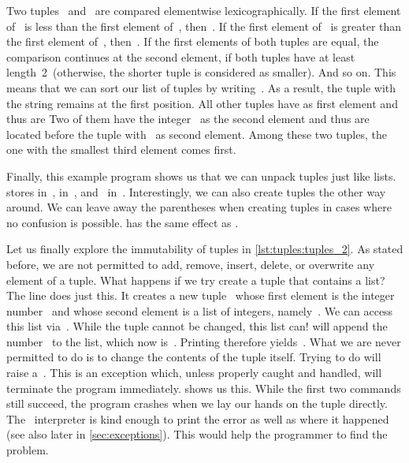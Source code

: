 Two tuples~ and~ are compared elementwise lexicographically.
If the first element of~ is less than the first element of~, then~.
If the first element of~ is greater than the first element of~, then~.
If the first elements of both tuples are equal, the comparison continues at the second element, if both tuples have at least length~2~(otherwise, the shorter tuple is considered as smaller).
And so on.
This means that we can sort our list of tuples by writing~.
As a result, the tuple with the string  remains at the first position.
All other tuples have  as first element and thus are 
Two of them have the integer~ as the second element and thus are located before the tuple with~ as second element.
Among these two tuples, the one with the smallest third element comes first.

Finally, this example program shows us that we can unpack tuples just like lists.
 stores  in~,  in~, and~ in~.
Interestingly, we can also create tuples the other way around.
We can leave away the parentheses when creating tuples in cases where no confusion is possible.
 has the same effect as .

Let us finally explore the immutability of tuples in \cref{lst:tuples:tuples_2}.
As stated before, we are not permitted to add, remove, insert, delete, or overwrite any element of a tuple.
What happens if we try create a tuple that contains a list?
The line  does just this.
It creates a new tuple~ whose first element is the integer number~ and whose second element is a list of integers, namely~\pythonil{[2]}.
We can access this list via~.
While the tuple cannot be changed, this list can!
 will append the number~ to the list, which now is~\pythonil{[2, 2]}.
Printing  therefore yields~.
%
%
%
What we are never permitted to do is to change the contents of the tuple itself.
Trying to do  will raise a~.
This is an exception which, unless properly caught and handled, will terminate the program immediately.
 shows us this.
While the first two  commands still succeed, the program crashes when we lay our hands on the tuple directly.
The \python\ interpreter is kind enough to print the error as well as where it happened (see also later in \cref{sec:exceptions}).
This would help the programmer to find the problem.

